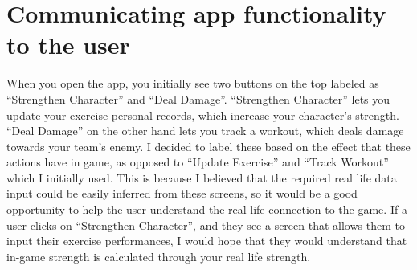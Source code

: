 \documentclass{l4proj}
\begin{document}
\section{Communicating app functionality to the user}
When you open the app, you initially see two buttons on the top labeled as ``Strengthen Character'' and ``Deal Damage''. ``Strengthen Character'' lets you update your exercise personal records, which increase your character's strength. ``Deal Damage'' on the other hand lets you track a workout, which deals damage towards your team's enemy. I decided to label these based on the effect that these actions have in game, as opposed to ``Update Exercise'' and ``Track Workout'' which I initially used. This is because I believed that the required real life data input could be easily inferred from these screens, so it would be a good opportunity to help the user understand the real life connection to the game. If a user clicks on ``Strengthen Character'', and they see a screen that allows them to input their exercise performances, I would hope that they would understand that in-game strength is calculated through your real life strength. 
\end{document}
